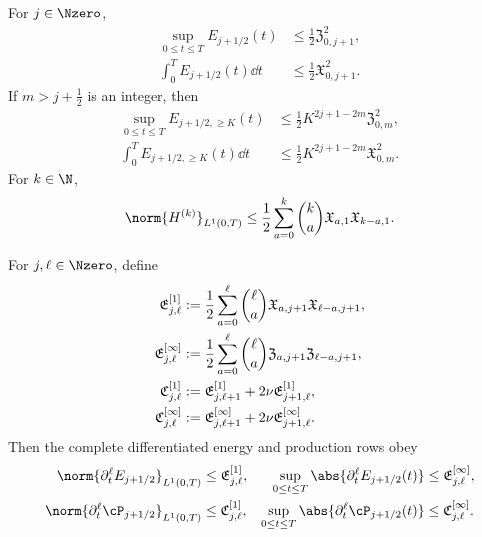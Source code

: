 {\begin{theorem}
For \(j\in\Nzero\),
\begin{align}
 \sup_{0\le t\le T}E_{j+1/2}(t)
 &\le\frac12\mathfrak Z_{0,j+1}^2,
 \label{eq:qc-sharp-critical-sup}\\
 \int_0^TE_{j+1/2}(t)\dd t
 &\le\frac12\mathfrak X_{0,j+1}^2.
 \label{eq:qc-sharp-critical-mass}
\end{align}
If \(m>j+\frac12\) is an integer, then
\begin{align}
 \sup_{0\le t\le T}E_{j+1/2,\ge K}(t)
 &\le\frac12K^{2j+1-2m}\mathfrak Z_{0,m}^2,
 \label{eq:qc-sharp-critical-tail-sup}\\
 \int_0^TE_{j+1/2,\ge K}(t)\dd t
 &\le\frac12K^{2j+1-2m}\mathfrak X_{0,m}^2.
 \label{eq:qc-sharp-critical-tail-mass}
\end{align}
For \(k\in\N\),
\begin{equation}
 \norm{H^{(k)}}_{L^1(0,T)}
 \le\frac12\sum_{a=0}^{k}\binom ka
 \mathfrak X_{a,1}\mathfrak X_{k-a,1}.
 \label{eq:qc-sharp-height-derivatives}
\end{equation}
\begin{samepage}
For \(j,\ell\in\Nzero\), define
\begin{align}
 \mathfrak E_{j,\ell}^{[1]}
 &:=\frac12\sum_{a=0}^{\ell}\binom\ell a
 \mathfrak X_{a,j+1}\mathfrak X_{\ell-a,j+1},
 \notag\\
 \mathfrak E_{j,\ell}^{[\infty]}
 &:=\frac12\sum_{a=0}^{\ell}\binom\ell a
 \mathfrak Z_{a,j+1}\mathfrak Z_{\ell-a,j+1},
 \label{eq:qc-height-row-majorants}\\
 \mathfrak C_{j,\ell}^{[1]}
 &:=\mathfrak E_{j,\ell+1}^{[1]}
    +2\nu\mathfrak E_{j+1,\ell}^{[1]},
 \notag\\
 \mathfrak C_{j,\ell}^{[\infty]}
 &:=\mathfrak E_{j,\ell+1}^{[\infty]}
    +2\nu\mathfrak E_{j+1,\ell}^{[\infty]}.
 \label{eq:qc-production-row-majorants}
\end{align}
Then the complete differentiated energy and production rows obey
\begin{align}
 \norm{\partial_t^\ell E_{j+1/2}}_{L^1(0,T)}
 &\le\mathfrak E_{j,\ell}^{[1]},
 &
 \sup_{0\le t\le T}
 \abs{\partial_t^\ell E_{j+1/2}(t)}
 &\le\mathfrak E_{j,\ell}^{[\infty]},
 \label{eq:qc-sharp-energy-row-family}\\
 \norm{\partial_t^\ell\cP_{j+1/2}}_{L^1(0,T)}
 &\le\mathfrak C_{j,\ell}^{[1]},
 &
 \sup_{0\le t\le T}
 \abs{\partial_t^\ell\cP_{j+1/2}(t)}
 &\le\mathfrak C_{j,\ell}^{[\infty]}.
 \label{eq:qc-sharp-production-row-family}
\end{align}
\end{samepage}

\end{theorem}}
